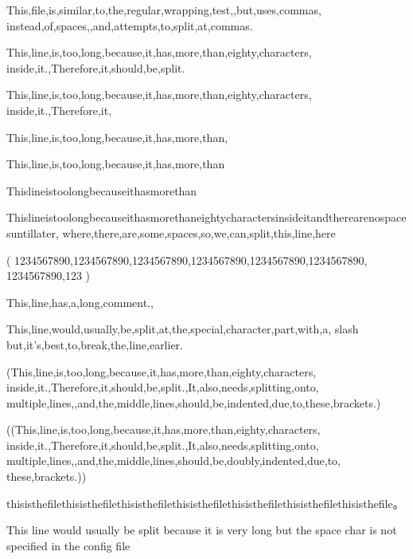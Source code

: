 \documentclass{article}
\begin{document}
This,file,is,similar,to,the,regular,wrapping,test,,but,uses,commas,
instead,of,spaces,,and,attempts,to,split,at,commas.

This,line,is,too,long,because,it,has,more,than,eighty,characters,
inside,it.,Therefore,it,should,be,split.

This,line,is,too,long,because,it,has,more,than,eighty,characters,
inside,it.,Therefore,it,%

This,line,is,too,long,because,it,has,more,than,%

This,line,is,too,long,because,it,has,more,than%

Thislineistoolongbecauseithasmorethan%

Thislineistoolongbecauseithasmorethaneightycharactersinsideitandtherearenospacesuntillater,
where,there,are,some,spaces,so,we,can,split,this,line,here

(
  1234567890,1234567890,1234567890,1234567890,1234567890,1234567890,
  1234567890,123
)

This,line,has,a,long,comment.,%


This,line,would,usually,be,split,at,the,special,character,part,with,a,
slash\,but,it's,best,to,break,the,line,earlier.

(This,line,is,too,long,because,it,has,more,than,eighty,characters,
  inside,it.,Therefore,it,should,be,split.,It,also,needs,splitting,onto,
multiple,lines,,and,the,middle,lines,should,be,indented,due,to,these,brackets.)

((This,line,is,too,long,because,it,has,more,than,eighty,characters,
    inside,it.,Therefore,it,should,be,split.,It,also,needs,splitting,onto,
    multiple,lines,,and,the,middle,lines,should,be,doubly,indented,due,to,
these,brackets.))

thisisthefilethisisthefilethisisthefilethisisthefilethisisthefilethisisthefilethisisthefile。

This line would usually be split because it is very long but the space char is not specified in the config file
\end{document}
